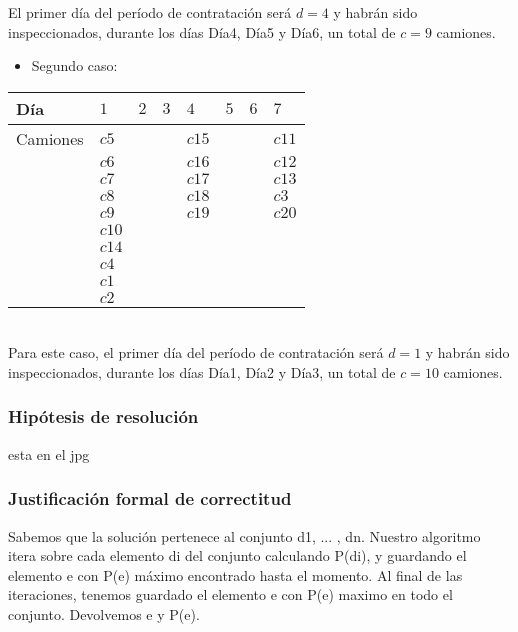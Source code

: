 \documentclass[11pt, a4paper, twoside]{article}
\begin{document}
El primer día del período de contratación será $d=4$ y habrán sido inspeccionados, durante los días Día4, Día5 y Día6, un total de $c=9$ camiones. \\

\begin{itemize}
	\item Segundo caso:
\end{itemize} 

\begin{tabular}{|l|l|l|l|l|l|l|l|}
	\hline
	Día          &  $1$  & $2$   & $3$   & $4$    & $5$ & $6$ & $7$   \\
	\hline
	Camiones     &  $c5$ &       &       & $c15$  &     &     & $c11$ \\
				 &  $c6$ &       &       & $c16$  &     &     & $c12$ \\    
				 &	$c7$ &       &       & $c17$  &     &     & $c13$ \\  
				 &	$c8$ &       &       & $c18$  &     &     & $c3$  \\
				 &	$c9$ &       &       & $c19$  &     &     & $c20$ \\
				 &	$c10$&       &       &        &     &     &       \\
				 &	$c14$&       &       &        &     &     &       \\
				 &	$c4$ &       &       &        &     &     &       \\
				 &	$c1$ &       &       &        &     &     &       \\
				 &	$c2$ &       &       &        &     &     &       \\
	\hline
\end{tabular} \\

Para este caso, el primer día del período de contratación será $d=1$ y habrán sido inspeccionados, durante los días Día1, Día2 y Día3, un total de $c=10$ camiones. 


\subsubsection{Hipótesis de resolución}
esta en el jpg
\subsubsection{Justificación formal de correctitud}
Sabemos que la soluci\'on pertenece al conjunto {d1, ... , dn}. Nuestro algoritmo itera sobre cada elemento di del conjunto calculando P(di), y guardando el elemento e con P(e) m\'aximo encontrado hasta el momento. Al final de las iteraciones, tenemos guardado el elemento e con P(e) maximo en todo el conjunto. Devolvemos e y P(e).
\end{document}
